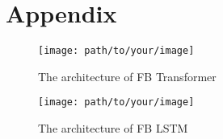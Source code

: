 \documentclass[11pt]{article}
\begin{document}



\appendix

\section{Appendix}

\begin{figure}[h]
  \centering
  \texttt{[image: path/to/your/image]}
  \caption{The architecture of FB Transformer}
  \label{fig:fb_transformer}
\end{figure}

\begin{figure}[h]
  \centering
  \texttt{[image: path/to/your/image]}
  \caption{The architecture of FB LSTM}
  \label{fig:fb_lstm}
\end{figure}

\end{document}
